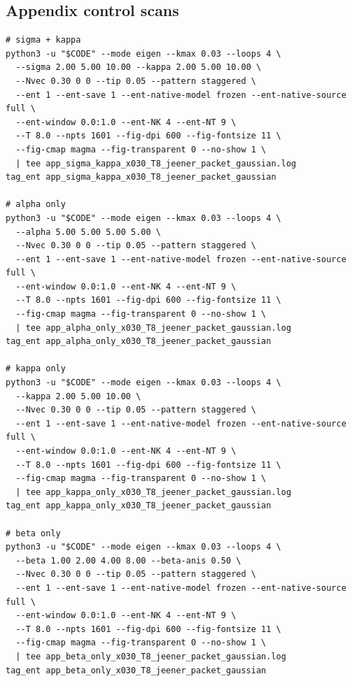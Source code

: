 \documentclass[11pt]{article}
\begin{document}
\subsection{Appendix control scans}
\begin{lstlisting}[style=bashstyle]
# sigma + kappa
python3 -u "$CODE" --mode eigen --kmax 0.03 --loops 4 \
  --sigma 2.00 5.00 10.00 --kappa 2.00 5.00 10.00 \
  --Nvec 0.30 0 0 --tip 0.05 --pattern staggered \
  --ent 1 --ent-save 1 --ent-native-model frozen --ent-native-source full \
  --ent-window 0.0:1.0 --ent-NK 4 --ent-NT 9 \
  --T 8.0 --npts 1601 --fig-dpi 600 --fig-fontsize 11 \
  --fig-cmap magma --fig-transparent 0 --no-show 1 \
  | tee app_sigma_kappa_x030_T8_jeener_packet_gaussian.log
tag_ent app_sigma_kappa_x030_T8_jeener_packet_gaussian

# alpha only
python3 -u "$CODE" --mode eigen --kmax 0.03 --loops 4 \
  --alpha 5.00 5.00 5.00 5.00 \
  --Nvec 0.30 0 0 --tip 0.05 --pattern staggered \
  --ent 1 --ent-save 1 --ent-native-model frozen --ent-native-source full \
  --ent-window 0.0:1.0 --ent-NK 4 --ent-NT 9 \
  --T 8.0 --npts 1601 --fig-dpi 600 --fig-fontsize 11 \
  --fig-cmap magma --fig-transparent 0 --no-show 1 \
  | tee app_alpha_only_x030_T8_jeener_packet_gaussian.log
tag_ent app_alpha_only_x030_T8_jeener_packet_gaussian

# kappa only
python3 -u "$CODE" --mode eigen --kmax 0.03 --loops 4 \
  --kappa 2.00 5.00 10.00 \
  --Nvec 0.30 0 0 --tip 0.05 --pattern staggered \
  --ent 1 --ent-save 1 --ent-native-model frozen --ent-native-source full \
  --ent-window 0.0:1.0 --ent-NK 4 --ent-NT 9 \
  --T 8.0 --npts 1601 --fig-dpi 600 --fig-fontsize 11 \
  --fig-cmap magma --fig-transparent 0 --no-show 1 \
  | tee app_kappa_only_x030_T8_jeener_packet_gaussian.log
tag_ent app_kappa_only_x030_T8_jeener_packet_gaussian

# beta only
python3 -u "$CODE" --mode eigen --kmax 0.03 --loops 4 \
  --beta 1.00 2.00 4.00 8.00 --beta-anis 0.50 \
  --Nvec 0.30 0 0 --tip 0.05 --pattern staggered \
  --ent 1 --ent-save 1 --ent-native-model frozen --ent-native-source full \
  --ent-window 0.0:1.0 --ent-NK 4 --ent-NT 9 \
  --T 8.0 --npts 1601 --fig-dpi 600 --fig-fontsize 11 \
  --fig-cmap magma --fig-transparent 0 --no-show 1 \
  | tee app_beta_only_x030_T8_jeener_packet_gaussian.log
tag_ent app_beta_only_x030_T8_jeener_packet_gaussian
\end{lstlisting}
\end{document}
